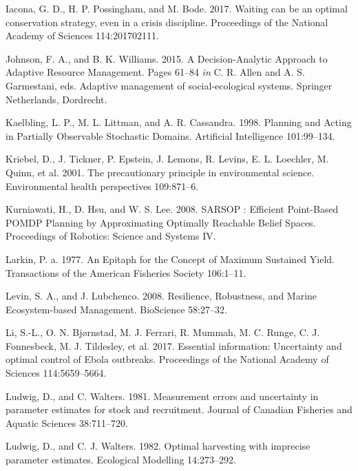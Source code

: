 \documentclass[3p]{elsarticle} %
\begin{document}
\leavevmode\hypertarget{ref-Iacona2017}{}%
Iacona, G. D., H. P. Possingham, and M. Bode. 2017. Waiting can be an
optimal conservation strategy, even in a crisis discipline. Proceedings
of the National Academy of Sciences 114:201702111.

\leavevmode\hypertarget{ref-Johnson2015}{}%
Johnson, F. A., and B. K. Williams. 2015. A Decision-Analytic Approach
to Adaptive Resource Management. Pages 61--84 \emph{in} C. R. Allen and
A. S. Garmestani, eds. Adaptive management of social-ecological systems.
Springer Netherlands, Dordrecht.

\leavevmode\hypertarget{ref-Kaelbling1998}{}%
Kaelbling, L. P., M. L. Littman, and A. R. Cassandra. 1998. Planning and
Acting in Partially Observable Stochastic Domains. Artificial
Intelligence 101:99--134.

\leavevmode\hypertarget{ref-Kriebel2001}{}%
Kriebel, D., J. Tickner, P. Epstein, J. Lemons, R. Levins, E. L.
Loechler, M. Quinn, et al. 2001. The precautionary principle in
environmental science. Environmental health perspectives 109:871--6.

\leavevmode\hypertarget{ref-Kurniawati2008}{}%
Kurniawati, H., D. Hsu, and W. S. Lee. 2008. SARSOP : Efficient
Point-Based POMDP Planning by Approximating Optimally Reachable Belief
Spaces. Proceedings of Robotics: Science and Systems IV.

\leavevmode\hypertarget{ref-Larkin1977}{}%
Larkin, P. a. 1977. An Epitaph for the Concept of Maximum Sustained
Yield. Transactions of the American Fisheries Society 106:1--11.

\leavevmode\hypertarget{ref-Levin2008}{}%
Levin, S. A., and J. Lubchenco. 2008. Resilience, Robustness, and Marine
Ecosystem-based Management. BioScience 58:27--32.

\leavevmode\hypertarget{ref-Li2017}{}%
Li, S.-L., O. N. Bjørnstad, M. J. Ferrari, R. Mummah, M. C. Runge, C. J.
Fonnesbeck, M. J. Tildesley, et al. 2017. Essential information:
Uncertainty and optimal control of Ebola outbreaks. Proceedings of the
National Academy of Sciences 114:5659--5664.

\leavevmode\hypertarget{ref-Ludwig1981}{}%
Ludwig, D., and C. Walters. 1981. Measurement errors and uncertainty in
parameter estimates for stock and recruitment. Journal of Canadian
Fisheries and Aquatic Sciences 38:711--720.

\leavevmode\hypertarget{ref-Ludwig1982}{}%
Ludwig, D., and C. J. Walters. 1982. Optimal harvesting with imprecise
parameter estimates. Ecological Modelling 14:273--292.
\end{document}
